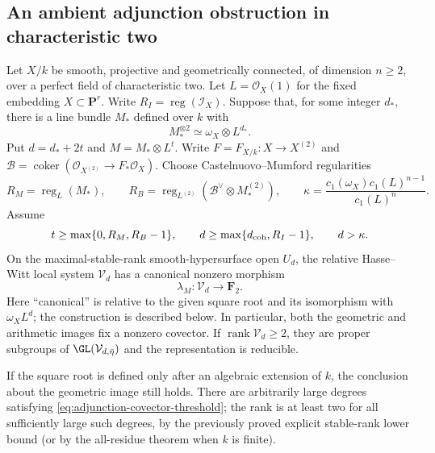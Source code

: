 \subsection{An ambient adjunction obstruction in characteristic two}
\label{subsec:general-adjunction-covector}

\begin{theorem}\label{thm:general-adjunction-covector}
Let $X/k$ be smooth, projective and geometrically connected, of
dimension $n\geq2$, over a perfect field of characteristic two.
Let $L=\mathcal O_X(1)$ for the fixed embedding $X\subset\mathbf P^r$.
Write $R_I=\operatorname{reg}(\mathcal I_X)$.
Suppose that, for some
integer $d_*$, there is a line bundle $M_*$ defined over $k$ with
\[
 M_*^{\otimes2}\simeq\omega_X\otimes L^{d_*}.
\]
Put $d=d_*+2t$ and $M=M_*\otimes L^t$.
Write $F=F_{X/k}:X\to X^{(2)}$ and
$\mathcal B=\operatorname{coker}(\mathcal O_{X^{(2)}}\to F_*\mathcal O_X)$.
Choose Castelnuovo--Mumford regularities
\[
 R_M=\operatorname{reg}_L(M_*),\qquad
 R_B=\operatorname{reg}_{L^{(2)}}
       (\mathcal B^\vee\otimes M_*^{(2)}),
 \qquad
 \kappa=\frac{c_1(\omega_X)c_1(L)^{n-1}}{c_1(L)^n}.
\]
Assume
\begin{equation}\label{eq:adjunction-covector-threshold}
 t\geq\max\{0,R_M,R_B-1\},\qquad
 d\geq\max\{d_{\rm coh},R_I-1\},\qquad d>\kappa.
\end{equation}
On the maximal-stable-rank smooth-hypersurface open $U_d$,
the relative Hasse--Witt local system $\mathcal V_d$ has a
canonical nonzero morphism
\begin{equation}\label{eq:adjunction-invariant-covector}
 \lambda_M:\mathcal V_d\longrightarrow\mathbf F_2.
\end{equation}
Here ``canonical'' is relative to the given square root and its
isomorphism with $\omega_X L^d$; the construction is described below.
In particular, both the geometric and arithmetic images fix a
nonzero covector.  If $\operatorname{rank}\mathcal V_d\geq2$,
they are proper subgroups of $\GL(\mathcal V_{d,\bar\eta})$ and
the representation is reducible.

If the square root is defined only after an algebraic extension
of $k$, the conclusion about the geometric image still holds.
There are arbitrarily large degrees satisfying
\eqref{eq:adjunction-covector-threshold}; the rank is at least two
for all sufficiently large such degrees, by the previously proved
explicit stable-rank lower bound (or by the all-residue theorem
when $k$ is finite).
\end{theorem}


